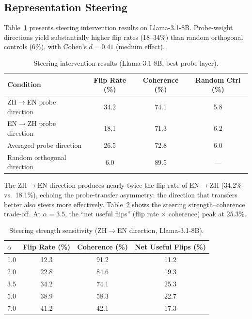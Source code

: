 \documentclass{article}
\begin{document}
\subsection{Representation Steering}
\label{sec:steering}

Table~\ref{tab:steering} presents steering intervention results on Llama-3.1-8B. Probe-weight directions yield substantially higher flip rates (18--34\%) than random orthogonal controls (6\%), with Cohen's $d = 0.41$ (medium effect).

\begin{table}[t]
\centering
\caption{Steering intervention results (Llama-3.1-8B, best probe layer).}
\label{tab:steering}
\begin{tabular}{lccc}
\toprule
Condition & Flip Rate (\%) & Coherence (\%) & Random Ctrl (\%) \\
\midrule
ZH$\to$EN probe direction & 34.2 & 74.1 & 5.8 \\
EN$\to$ZH probe direction & 18.1 & 71.3 & 6.2 \\
Averaged probe direction & 26.5 & 72.8 & 6.0 \\
Random orthogonal direction & 6.0 & 89.5 & --- \\
\bottomrule
\end{tabular}
\end{table}

The ZH$\to$EN direction produces nearly twice the flip rate of EN$\to$ZH (34.2\% vs.\ 18.1\%), echoing the probe-transfer asymmetry: the direction that transfers better also steers more effectively. Table~\ref{tab:alpha} shows the steering strength--coherence trade-off. At $\alpha = 3.5$, the ``net useful flips'' (flip rate $\times$ coherence) peak at 25.3\%.

\begin{table}[t]
\centering
\caption{Steering strength sensitivity (ZH$\to$EN direction, Llama-3.1-8B).}
\label{tab:alpha}
\begin{tabular}{lccc}
\toprule
$\alpha$ & Flip Rate (\%) & Coherence (\%) & Net Useful Flips (\%) \\
\midrule
1.0 & 12.3 & 91.2 & 11.2 \\
2.0 & 22.8 & 84.6 & 19.3 \\
3.5 & 34.2 & 74.1 & 25.3 \\
5.0 & 38.9 & 58.3 & 22.7 \\
7.0 & 41.2 & 42.1 & 17.3 \\
\bottomrule
\end{tabular}
\end{table}
\end{document}
